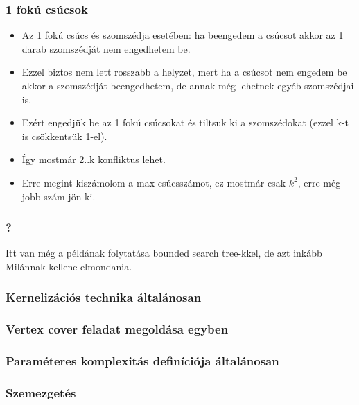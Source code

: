 \documentclass[aspectratio=169]{beamer}
\begin{document}
\begin{frame}
\frametitle{1 fokú csúcsok}
\begin{itemize}
\item Az 1 fokú csúcs és szomszédja esetében: ha beengedem a csúcsot akkor az 1 darab szomszédját nem engedhetem be.
\item Ezzel biztos nem lett rosszabb a helyzet, mert ha a csúcsot nem engedem be akkor a szomszédját beengedhetem, de annak még lehetnek egyéb szomszédjai is.
\item Ezért engedjük be az 1 fokú csúcsokat és tiltsuk ki a szomszédokat (ezzel k-t is csökkentsük 1-el).
\item Így mostmár 2..k konfliktus lehet.
\item Erre megint kiszámolom a max csúcsszámot, ez mostmár csak $k^2$, erre még jobb szám jön ki.
\end{itemize}
\end{frame}

\begin{frame}
\frametitle{?}
Itt van még a példának folytatása bounded search tree-kkel, de azt inkább Milánnak kellene elmondania.
\end{frame}


\begin{frame}
\frametitle{Kernelizációs technika általánosan}
\end{frame}


\begin{frame}
\frametitle{Vertex cover feladat megoldása egyben}
\end{frame}

\begin{frame}
\frametitle{Paraméteres komplexitás definíciója általánosan}
\end{frame}

\begin{frame}
\frametitle{Szemezgetés}
\end{frame}
\end{document}
